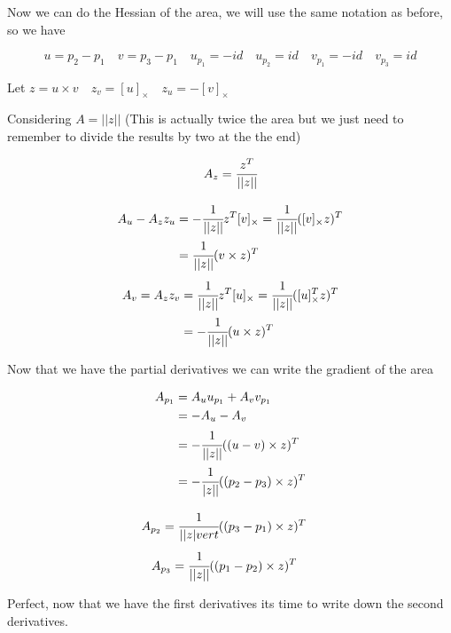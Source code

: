 \documentclass[11pt]{article}
\theoremstyle{plain}
\theoremstyle{definition}
\begin{document}
\newpage 

Now we can do the Hessian of the area, we will use the same notation as before, so we have


\begin{equation}
    u = p_2 - p_1 \quad v = p_3 - p_1 \quad u_{p_1} = -id \quad u_{p_2} = id \quad v_{p_1} = -id \quad v_{p_3} = id
\end{equation}

Let $z  = u \times v \quad z_v = [u]_{\times} \quad z_u = -[v]_{\times}$

Considering $A = \vert|z\vert|$ (This is actually twice the area but we just need to remember to divide the results by two at the the end)

\begin{equation}
    A_z = \cfrac{z^T}{\vert| z \vert|} 
\end{equation}


\begin{align}
    A_u - A_z z_u &= -\cfrac{1}{\vert| z\vert|}z^T [v]_\times = \cfrac{1}{\vert| z\vert|}([v]_\times z)^T\\
    &=\cfrac{1}{\vert| z \vert|} (v\times z )^T
\end{align}
\begin{align}
    A_v = A_z z_v & = \cfrac{1}{\vert| z \vert|}z^T [u]_\times = \cfrac{1}{\vert| z \vert|}([u]_\times^T z)^T\\
    &= -\cfrac{1}{\vert| z \vert|} (u\times z)^T
\end{align}


Now that we have the partial derivatives we can write the gradient of the area

\begin{align}
    A_{p_1} &= A_u u_{p_1} + A_v v_{p_1} \\
    &=  -A_u - A_v \\
    &= -\cfrac{1}{\vert| z \vert|} ((u-v)\times z)^T\\
    &= -\cfrac{1}{\vert z \vert|} ((p_2-p_3)\times z)^T 
\end{align}

\begin{align}
    A_{p_2} &= \cfrac{1}{\vert| z |vert}((p_3-p_1)\times z)^T
\end{align}
\begin{align}
    A_{p_3} &= \cfrac{1}{\vert| z \vert|}((p_1-p_2)\times z)^T
\end{align}


Perfect, now that we have the first derivatives its time to write down the second derivatives.
\end{document}
